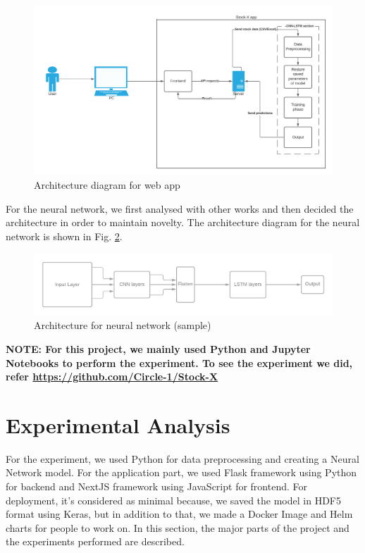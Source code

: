 \documentclass[conference]{IEEEtran}
\begin{document}
\begin{figure}[htbp]
\centerline{\includegraphics[scale=0.07]{SI - Arch.png}}
\caption{Architecture diagram for web app}
\label{simple-arch}
\end{figure}

For the neural network, we first analysed with other works and then decided the architecture in order to maintain novelty. The architecture diagram for the neural network is shown in Fig. \ref{model-sam}.

\begin{figure}[htbp]
\centerline{\includegraphics[scale=0.2]{Model-sam.png}}
\caption{Architecture for neural network (sample)}
\label{model-sam}
\end{figure}

\textbf{NOTE: For this project, we mainly used Python and Jupyter Notebooks to perform the experiment. To see the experiment we did, refer \url{https://github.com/Circle-1/Stock-X}}

\section{Experimental Analysis}
For the experiment, we used Python for data preprocessing and creating a Neural Network model. For the application part, we used Flask framework using Python for backend and NextJS framework using JavaScript for frontend. For deployment, it's considered as minimal because, we saved the model in HDF5 format using Keras, but in addition to that, we made a Docker Image and Helm charts for people to work on. In this section, the major parts of the project and the experiments performed are described.
\end{document}
